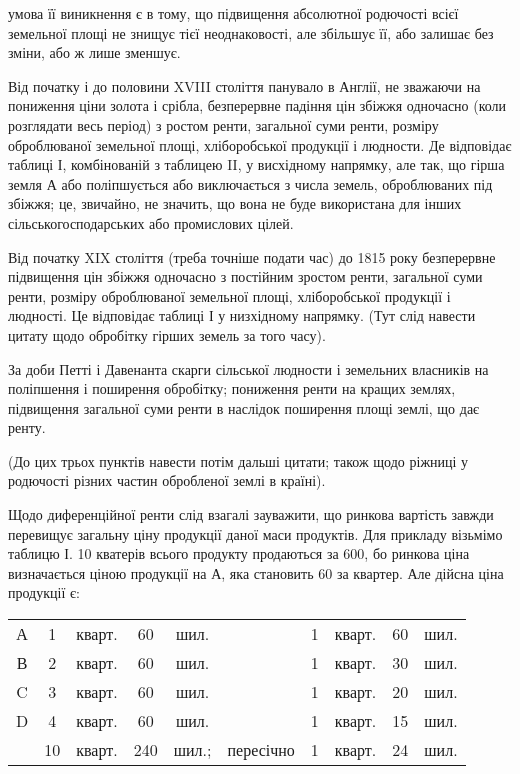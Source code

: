 \parcont{}  %
умова її виникнення є в тому, що підвищення абсолютної родючості всієї земельної площі не знищує
тієї неоднаковості, але збільшує її, або залишає без зміни, або ж лише зменшує.

Від початку і до половини XVIII століття панувало в Англії, не зважаючи на пониження ціни золота і
срібла, безперервне падіння цін збіжжя одночасно (коли розглядати весь період) з ростом ренти,
загальної суми ренти, розміру оброблюваної земельної площі, хліборобської продукції і людности. Де
відповідає таблиці І, комбінованій з таблицею II, у висхідному напрямку, але так, що гірша земля $А$
або поліпшується або виключається з числа земель, оброблюваних під збіжжя; це, звичайно, не значить,
що вона не буде використана для інших сільськогосподарських або промислових цілей.

Від початку XIX століття (треба точніше подати час) до 1815 року безперервне підвищення цін збіжжя
одночасно з постійним зростом ренти, загальної суми ренти, розміру оброблюваної земельної площі,
хліборобської продукції і людності. Це відповідає таблиці І у низхідному напрямку. (Тут слід навести
цитату щодо обробітку гірших земель за того часу).

За доби Петті і Давенанта скарги сільської людности і земельних власників на поліпшення і поширення
обробітку; пониження ренти на кращих землях, підвищення загальної суми ренти в наслідок поширення
площі землі, що дає ренту.

(До цих трьох пунктів навести потім дальші цитати; також щодо ріжниці у родючості різних частин
обробленої землі в країні).

Щодо диференційної ренти слід взагалі зауважити, що ринкова вартість завжди перевищує загальну ціну
продукції даної маси продуктів. Для прикладу візьмімо таблицю І. 10 кватерів всього продукту
продаються за 600, бо ринкова ціна визначається ціною продукції на $А$, яка становить 60 за
квартер. Але дійсна ціна продукції є:

\begin{center}
  \begin{tabular}{c@{ } c@{ } c@{ } c@{ } c c c@{ } c@{ } c@{ } c}
    А & \phantom{0}1 & кварт. \deq{} & \phantom{0}60 & шил. & & 1 & кварт.\phantom{=} & 60 & шил. \\
    В & \phantom{0}2 & кварт. \deq{} & \phantom{0}60 & шил. & & 1 & кварт.\phantom{=} & 30 & шил. \\
    C & \phantom{0}3 & кварт. \deq{} & \phantom{0}60 & шил. & & 1 & кварт.\phantom{=} & 20 & шил. \\
    D & \phantom{0}4 & кварт. \deq{} & \phantom{0}60 & шил. & & 1 & кварт.\phantom{=} & 15 & шил. \\
    \midrule
    & 10 & кварт. \deq{} & 240 & шил.; & пересічно & 1 & кварт. \deq{} & 24 & шил. \\
  \end{tabular}
\end{center}

